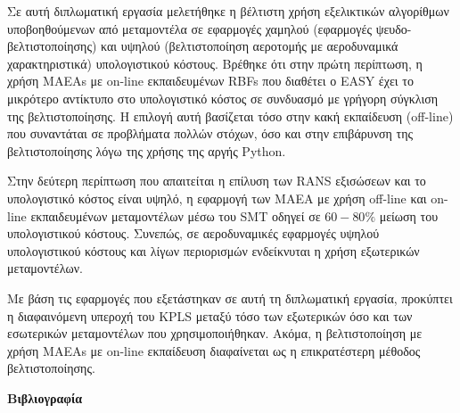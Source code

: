 \documentclass[twoside, 12pt,notitlepage]{report}
\begin{document}
Σε αυτή διπλωματική εργασία μελετήθηκε η βέλτιστη χρήση 
εξελικτικών αλγορίθμων υποβοηθούμενων από μεταμοντέλα σε εφαρμογές 
χαμηλού (εφαρμογές ψευδο-βελτιστοποίησης) και υψηλού 
(βελτιστοποίηση αεροτομής με αεροδυναμικά χαρακτηριστικά) 
υπολογιστικού κόστους. Βρέθηκε ότι στην πρώτη περίπτωση, η χρήση 
MAEAs με on-line εκπαιδευμένων RBFs που διαθέτει ο EASY έχει το 
μικρότερο αντίκτυπο στο υπολογιστικό κόστος σε συνδυασμό με γρήγορη 
σύγκλιση της βελτιστοποίησης. Η επιλογή αυτή βασίζεται τόσο στην 
κακή εκπαίδευση (off-line) που συναντάται σε προβλήματα πολλών 
στόχων, όσο και στην επιβάρυνση της βελτιστοποίησης λόγω της χρήσης 
της αργής Python.

Στην δεύτερη περίπτωση που 
απαιτείται η επίλυση των RANS εξισώσεων και το υπολογιστικό κόστος 
είναι υψηλό, η εφαρμογή των ΜΑΕΑ με χρήση off-line και 
on-line εκπαιδευμένων μεταμοντέλων μέσω του SMT οδηγεί σε 
$60-80 \%$ μείωση του υπολογιστικού κόστους. Συνεπώς, σε
αεροδυναμικές εφαρμογές υψηλού υπολογιστικού κόστους και λίγων 
περιορισμών ενδείκνυται η χρήση εξωτερικών μεταμοντέλων.

Με βάση τις εφαρμογές που εξετάστηκαν σε αυτή τη διπλωματική 
εργασία, προκύπτει η διαφαινόμενη υπεροχή του KPLS μεταξύ τόσο των 
εξωτερικών όσο και των εσωτερικών μεταμοντέλων που χρησιμοποιήθηκαν. 
Ακόμα, η βελτιστοποίηση με χρήση MAEAs με on-line εκπαίδευση 
διαφαίνεται ως η επικρατέστερη μέθοδος βελτιστοποίησης.

\newpage

\clearpage
\textbf{Βιβλιογραφία}
\end{document}
